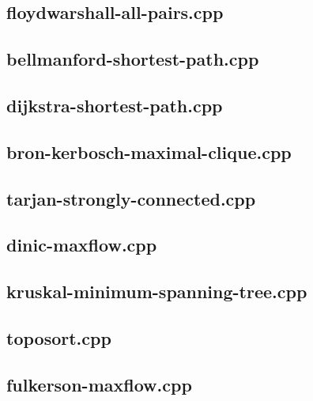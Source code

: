 \documentclass[10pt,twocolumn,landscape]{article}
\begin{document}
\subsection{floydwarshall-all-pairs.cpp}


\subsection{bellmanford-shortest-path.cpp}


\subsection{dijkstra-shortest-path.cpp}


\subsection{bron-kerbosch-maximal-clique.cpp}


\subsection{tarjan-strongly-connected.cpp}


\subsection{dinic-maxflow.cpp}


\subsection{kruskal-minimum-spanning-tree.cpp}


\subsection{toposort.cpp}


\subsection{fulkerson-maxflow.cpp}

\end{document}
